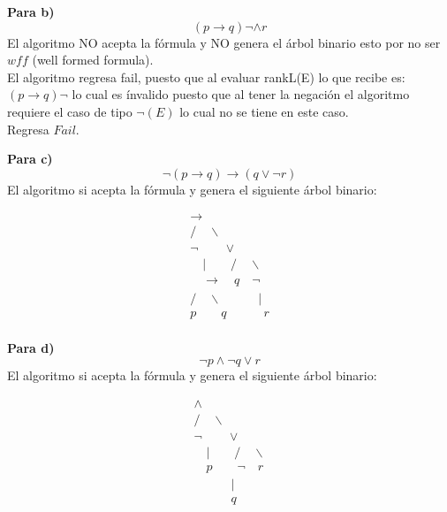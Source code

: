\textbf{Para b)}
\[
(p \rightarrow q) \neg \land r
\]  \newline
El algoritmo NO acepta la fórmula y  NO genera el
árbol binario esto por no ser $wff$ (well formed formula).\\
\newline
El algoritmo regresa fail, puesto que al evaluar rankL(E) lo que recibe es: \\
$ (p \rightarrow q) \neg$ lo cual es ínvalido puesto que al tener la negación el algoritmo requiere el caso de tipo $\neg (E)$ lo cual no se tiene en este caso.\\
Regresa $Fail$.\\
\newline

\textbf{Para c)}
\[
\neg (p \rightarrow q) \rightarrow (q \lor \neg r)
\]  \newline
El algoritmo si acepta la fórmula y genera el siguiente árbol binario: \newline

\begin{center}
\[
\begin{array}{c}
\rightarrow \\
/ \quad \backslash \\
\neg \quad \quad \lor \\
\quad | \quad \quad / \quad \backslash \\
\quad \rightarrow \quad  q \quad \neg \\
/ \quad \backslash \quad \quad \quad | \\
p \quad \quad q \quad \quad \quad r\\
\end{array}
\]
\end{center}

\textbf{Para d)}
\[
\neg p \land \neg q \lor r
\]  \newline
El algoritmo si acepta la fórmula y genera el siguiente árbol binario: \newline

\begin{center}
\[
\begin{array}{c}
\land \\
/ \quad \backslash \\
\neg \quad \quad \lor \\
\quad | \quad \quad / \quad \backslash \\
\quad p \quad \quad  \neg \quad r \\
\quad \quad \quad | \quad \\
\quad \quad \quad q \quad \\
\end{array}
\]
\end{center}

